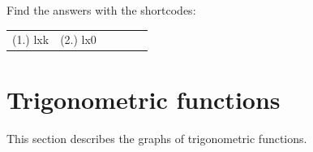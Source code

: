 \label{m39348*eip-714}
\par {} Find the answers with the shortcodes:
\par \begin{tabular}[h]{cccccc}
(1.) lxk  &  (2.) lx0  & \end{tabular}
\label{m39414*cid7}
\section{Trigonometric functions}
\nopagebreak
\label{m39414*id83471}This section describes the graphs of trigonometric functions.\par 
\label{m39414*uid30}
